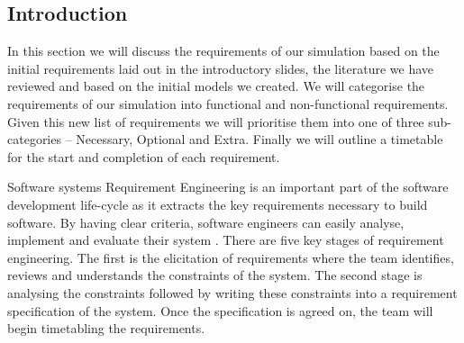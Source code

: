 \documentclass{article}
\begin{document}
	\subsection{Introduction}
	In this section we will discuss the requirements of our simulation based on the initial requirements laid out in the introductory slides, the literature we have reviewed and based on the initial models we created. 
	We will categorise the requirements of our simulation into functional and non-functional requirements. Given this new list of requirements we will prioritise them into one of three sub-categories  -- Necessary, Optional and Extra. 
	Finally we will outline a timetable for the start and completion of each requirement.  
	
	Software systems Requirement Engineering is an important part of the software development life-cycle as it extracts the key requirements necessary to build software. 
	By having clear criteria, software engineers can easily analyse, implement and evaluate their system \cite{nuseibeh2000requirements}. 
	There are five key stages of requirement engineering. The first is the elicitation of requirements where the team identifies, reviews and understands the constraints of the system. 
	The second stage is analysing the constraints followed by writing these constraints into a requirement specification of the system. 
	Once the specification is agreed on, the team will begin timetabling the requirements. 
	
\end{document}
